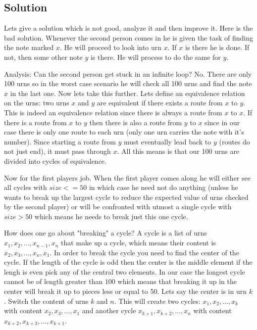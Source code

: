 \documentclass{article}
\begin{document}
\subsection{Solution}
Lets give a solution which is not good, analyze it and then improve it.
Here is the bad solution. Whenever the second person comes in he is given the task of finding the note marked $x$. He will proceed to look into urn $x$. If $x$ is there he is done. If not, then some other note $y$ is there. He will process to do the same for $y$.

Analysis: Can the second person get stuck in an infinite loop? No. There are only 100 urns so in the worst case scenario he will check all 100 urns and find the note $x$ in the last one. Now lets take this further. Lets define an equivalence relation on the urns: two urns $x$ and $y$ are equivalent if there exists a route from $x$ to $y$. This is indeed an equivalence relation since there is always a route from $x$ to $x$. If there is a route from $x$ to $y$ then there is also a route from $y$ to $x$ since in our case there is only one route to each urn (only one urn carries the note with it's number). Since starting a route from $y$ must eventually lead back to $y$ (routes do not just end), it must pass through $x$. All this means is that our 100 urns are divided into cycles of equivalence.

Now for the first players job. When the first player comes along he will either see all cycles with $size<=50$ in which case he need not do anything (unless he wants to break up the largest cycle to reduce the expected value of urns checked by the second player) or will be confronted with utmost a single cycle with $size > 50$ which means he needs to break just this one cycle.

How does one go about "breaking" a cycle? A cycle is a list of urns $x_1, x_2, \ldots,x_{n-1} ,x_n$ that make up a cycle, which means their content is $x_2, x_3, \ldots, x_n, x_1$. In order to break the cycle you need to find the center of the cycle. If the length of the cycle is odd then the center is the middle element if the lengh is even pick any of the central two elements. In our case the longest cycle cannot be of length greater than $100$ which means that breaking it up in the center will  break it up to pieces less or equal to 50. Lets say the center is in urn $k$. Switch the content of urns $k$ and $n$. This will create two cycles: $x_1, x_2, \ldots, x_k$ with content $x_2, x_3, \ldots, x_1$ and another cycle $x_{k+1}, x_{k+2}, \ldots, x_n$ with content $x_{k+2}, x_{k+3}, \ldots, x_{k+1}$.
\end{document}
